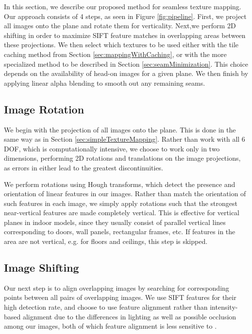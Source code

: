 \documentclass[10pt,twocolumn,letterpaper]{article}
\begin{document}
In this section, we describe our proposed method for seamless texture
mapping. Our approach consists of 4 steps, as seen in Figure
\ref{fig:pipeline}.  First, we project all images onto the plane and
rotate them for verticality. Next,we perform 2D shifting in order to
maximize SIFT feature matches in overlapping areas between these
projections. We then select which textures to be used either with the
tile caching method from Section \ref{sec:mappingWithCaching}, or with
the more specialized method to be described in Section
\ref{sec:seamMinimization}. This choice depends on the availability of
head-on images for a given plane. We then finish by applying linear
alpha blending to smooth out any remaining seams.

\subsection{Image Rotation}
\label{sec:projectionAndRotation}
We begin with the projection of all images onto the plane. This is
done in the same way as in Section
\ref{sec:simpleTextureMapping}. Rather than work with all 6 DOF, which
is computationally intensive, we choose to work only in two
dimensions, performing 2D rotations and translations on the image
projections, as errors in either lead to the greatest discontinuities.

We perform rotations using Hough transforms, which detect the presence
and orientation of linear features in our images. Rather than match
the orientation of such features in each image, we simply apply
rotations such that the strongest near-vertical features are made
completely vertical. This is effective for vertical planes in indoor
models, since they usually consist of parallel vertical lines
corresponding to doors, wall panels, rectangular frames, etc. If
features in the area are not vertical, e.g. for floors and ceilings,
this step is skipped.


\subsection{Image Shifting}
\label{sec:robustSIFTFeatureMatching}
Our next step is to align overlapping images by searching for
corresponding points between all pairs of overlapping images. We use
SIFT features for their high detection rate, and choose to use feature
alignment rather than intensity-based alignment due to the differences
in lighting as well as possible occlusion among our images, both of
which feature alignment is less sensitive to \cite{lai1999robust,
  lowe1999object, mikolajczyk2005performance, szeliski2006image}.
\end{document}
